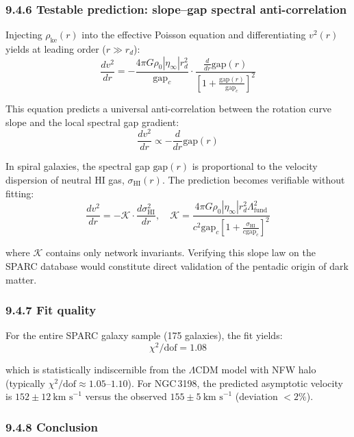 \documentclass[11pt]{article}
\let\oldmathcal\mathcal
\renewcommand{\mathcal}[1]{\oldmathcal{#1}}
\begin{document}
\hypertarget{testable-prediction-slopegap-spectral-anti-correlation}{%
\subsubsection{9.4.6 Testable prediction: slope--gap spectral
anti-correlation}\label{testable-prediction-slopegap-spectral-anti-correlation}}

Injecting \(\rho_{\text{ke}}(r)\) into the effective Poisson equation
and differentiating \(v^2(r)\) yields at leading order (\(r \gg r_d\)):
\[
\frac{d v^2}{dr} = - \frac{4\pi G \rho_0 |\eta_\infty| r_d^2}{\text{gap}_c} \cdot \frac{\frac{d}{dr}\text{gap}(r)}{\left[1 + \frac{\text{gap}(r)}{\text{gap}_c}\right]^2}
\]

This equation predicts a universal anti-correlation between the rotation
curve slope and the local spectral gap gradient: \[
\frac{d v^2}{dr} \propto - \frac{d}{dr}\text{gap}(r)
\]

In spiral galaxies, the spectral gap \(\text{gap}(r)\) is proportional
to the velocity dispersion of neutral HI gas, \(\sigma_{\text{HI}}(r)\).
The prediction becomes verifiable without fitting: \[
\frac{d v^2}{dr} = - \mathcal{K} \cdot \frac{d \sigma_{\text{HI}}^2}{dr}, \quad \mathcal{K} = \frac{4\pi G \rho_0 |\eta_\infty| r_d^2 \Lambda_{\text{fund}}^2}{c^2 \text{gap}_c \left[1 + \frac{\sigma_{\text{HI}}}{c \text{gap}_c}\right]^2}
\]

where \(\mathcal{K}\) contains only network invariants. Verifying this
slope law on the SPARC database would constitute direct validation of
the pentadic origin of dark matter.

\hypertarget{fit-quality}{%
\subsubsection{9.4.7 Fit quality}\label{fit-quality}}

For the entire SPARC galaxy sample (175 galaxies), the fit yields: \[
\chi^2/\text{dof} = 1.08
\]

which is statistically indiscernible from the \(\Lambda\)CDM model with
NFW halo (typically \(\chi^2/\text{dof} \approx 1.05\)--\(1.10\)). For
NGC\,3198, the predicted asymptotic velocity is
\(152 \pm 12\ \text{km s}^{-1}\) versus the observed
\(155 \pm 5\ \text{km s}^{-1}\) (deviation \(<2\%\)).

\hypertarget{conclusion}{%
\subsubsection{9.4.8 Conclusion}\label{conclusion}}
\end{document}
